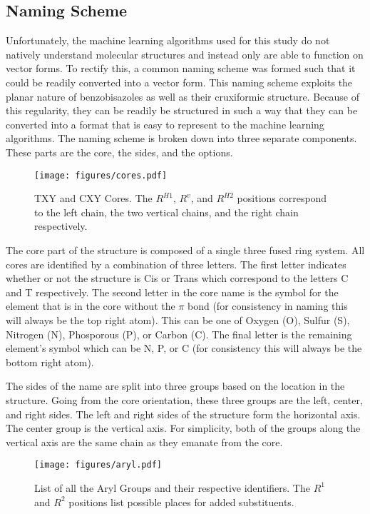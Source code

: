 \documentclass[10pt]{article}
\begin{document}
\subsection{Naming Scheme}

Unfortunately, the machine learning algorithms used for this study do not natively understand molecular structures and instead only are able to function on vector forms. To rectify this, a common naming scheme was formed such that it could be readily converted into a vector form. This naming scheme exploits the planar nature of benzobisazoles as well as their cruxiformic structure. Because of this regularity, they can be readily be structured in such a way that they can be converted into a format that is easy to represent to the machine learning algorithms. The naming scheme is broken down into three separate components. These parts are the core, the sides, and the options.

\begin{figure}[H]
  \begin{center}
    \texttt{[image: figures/cores.pdf]}
  \end{center}
  \caption{TXY and CXY Cores. The $R^{H1}$, $R^v$, and $R^{H2}$ positions correspond to the left chain, the two vertical chains, and the right chain respectively.}
  \label{fig:cores}
\end{figure}

The core part of the structure is composed of a single three fused ring system. All cores are identified by a combination of three letters. The first letter indicates whether or not the structure is Cis or Trans which correspond to the letters C and T respectively. The second letter in the core name is the symbol for the element that is in the core without the $\pi$ bond (for consistency in naming this will always be the top right atom). This can be one of Oxygen (O), Sulfur (S), Nitrogen (N), Phosporous (P), or Carbon (C). The final letter is the remaining element's symbol which can be N, P, or C (for consistency this will always be the bottom right atom).

The sides of the name are split into three groups based on the location in the structure. Going from the core orientation, these three groups are the left, center, and right sides. The left and right sides of the structure form the horizontal axis. The center group is the vertical axis. For simplicity, both of the groups along the vertical axis are the same chain as they emanate from the core.

\begin{figure}[H]
  \begin{center}
    \texttt{[image: figures/aryl.pdf]}
  \end{center}
  \caption{List of all the Aryl Groups and their respective identifiers. The $R^1$ and $R^2$ positions list possible places for added substituents.}
  \label{fig:Aryl}
\end{figure}
\end{document}
